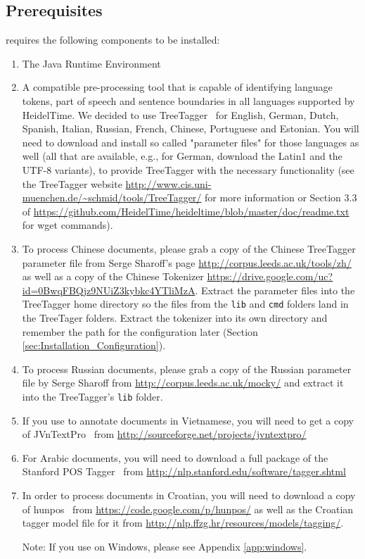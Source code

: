 \subsection{Prerequisites}\label{sec:Installation_Prerequisites}
\product{} requires the following components to be installed:
\begin{enumerate}
\item The Java Runtime Environment~\cite{Java}
\item A compatible pre-processing tool that is capable of identifying language tokens, part of speech and sentence boundaries in all languages supported by HeidelTime. We decided to use TreeTagger~\cite{Schmid1994} for English, German, Dutch, Spanish, Italian, Russian, French, Chinese, Portuguese and Estonian. You will need to download and install so called "parameter files" for those languages as well (all that are available, e.g., for German, download the Latin1 and the UTF-8 variants), to provide TreeTagger with the necessary functionality (see the TreeTagger website \url{http://www.cis.uni-muenchen.de/~schmid/tools/TreeTagger/} for more information or Section 3.3 of \url{https://github.com/HeidelTime/heideltime/blob/master/doc/readme.txt} for wget commands).
\item To process Chinese documents, please grab a copy of the Chinese TreeTagger parameter file from Serge Sharoff's page \url{http://corpus.leeds.ac.uk/tools/zh/} as well as a copy of the Chinese Tokenizer \url{https://drive.google.com/uc?id=0BwqFBQjz9NUiZ3kybkc4YTliMzA}. Extract the parameter files into the TreeTagger home directory so the files from the \texttt{lib} and \texttt{cmd} folders land in the TreeTager folders. Extract the tokenizer into its own directory and remember the path for the configuration later (Section \ref{sec:Installation_Configuration}).
\item To process Russian documents, please grab a copy of the Russian parameter file by Serge Sharoff from \url{http://corpus.leeds.ac.uk/mocky/} and extract it into the TreeTagger's \texttt{lib} folder.
\item If you use \product{} to annotate documents in Vietnamese, you will need to get a copy of JVnTextPro~\cite{JVnTextPro} from \url{http://sourceforge.net/projects/jvntextpro/}
\item For Arabic documents, you will need to download a full package of the Stanford POS Tagger~\cite{ToutanovaEtAl2003} from \url{http://nlp.stanford.edu/software/tagger.shtml}
\item In order to process documents in Croatian, you will need to download a copy of hunpos~\cite{HalacsyEtAl2007} from \url{https://code.google.com/p/hunpos/} as well as the Croatian tagger model file for it from \url{http://nlp.ffzg.hr/resources/models/tagging/}.

Note: If you use \product{} on Windows, please see Appendix \ref{app:windows}.
\end{enumerate}

